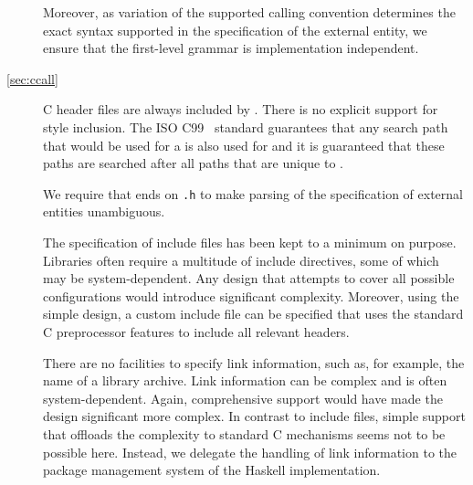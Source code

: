 \documentclass[a4paper,twosides]{article}
\newcommand{\code}[1]{\texttt{#1}}      %
\begin{document}
\begin{description}
  Moreover, as variation of the supported calling convention determines the
  exact syntax supported in the specification of the external entity, we
  ensure that the first-level grammar is implementation independent.
\item[\ref{sec:ccall}] C header files are always included by .  There is no explicit support for  style inclusion.  The ISO C99~\cite{C99} standard
  guarantees that any search path that would be used for a  is also used for  and
  it is guaranteed that these paths are searched after all paths that are
  unique to .
  
  We require that  ends on \code{.h} to make parsing of the
  specification of external entities unambiguous.

  The specification of include files has been kept to a
  minimum on purpose.  Libraries often require a multitude of include
  directives, some of which may be system-dependent.  Any design that attempts
  to cover all possible configurations would introduce significant complexity.
  Moreover, using the simple design, a custom include file can be specified
  that uses the standard C preprocessor features to include all relevant
  headers.
  
  There are no facilities to specify link information, such as, for example,
  the name of a library archive.  Link information can be complex and is often
  system-dependent.  Again, comprehensive support would have made the design
  significant more complex.  In contrast to include files, simple support that
  offloads the complexity to standard C mechanisms seems not to be possible
  here.  Instead, we delegate the handling of link information to the package
  management system of the Haskell implementation.
\end{description}




\end{document}
